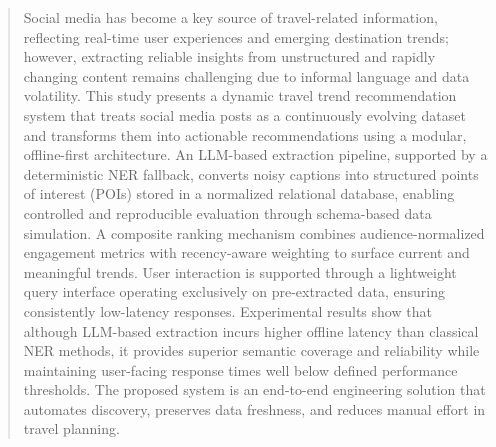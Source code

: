 \documentclass[a4paper,12pt]{report}
\begin{document}
\begin{abstract}
Social media has become a key source of travel-related information, reflecting real-time user experiences and emerging destination trends; however, extracting reliable insights from unstructured and rapidly changing content remains challenging due to informal language and data volatility. This study presents a dynamic travel trend recommendation system that treats social media posts as a continuously evolving dataset and transforms them into actionable recommendations using a modular, offline-first architecture. An LLM-based extraction pipeline, supported by a deterministic NER fallback, converts noisy captions into structured points of interest (POIs) stored in a normalized relational database, enabling controlled and reproducible evaluation through schema-based data simulation. A composite ranking mechanism combines audience-normalized engagement metrics with recency-aware weighting to surface current and meaningful trends. User interaction is supported through a lightweight query interface operating exclusively on pre-extracted data, ensuring consistently low-latency responses. Experimental results show that although LLM-based extraction incurs higher offline latency than classical NER methods, it provides superior semantic coverage and reliability while maintaining user-facing response times well below defined performance thresholds. The proposed system is an end-to-end engineering solution that automates discovery, preserves data freshness, and reduces manual effort in travel planning.
\end{abstract}
\end{document}
